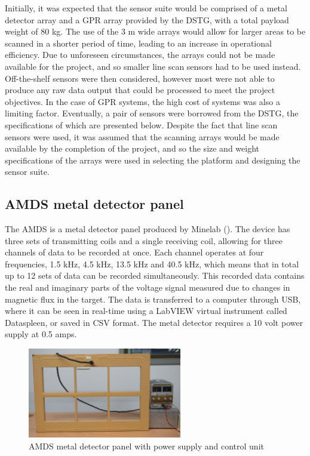 \documentclass[main.tex]{subfiles}
\begin{document}
Initially, it was expected that the sensor suite would be comprised of a metal detector array and a GPR array provided by the DSTG, with a total payload weight of 80 kg. The use of the 3 m wide arrays would allow for larger areas to be scanned in a shorter period of time, leading to an increase in operational efficiency. Due to unforeseen circumstances, the arrays could not be made available for the project, and so smaller line scan sensors had to be used instead. Off-the-shelf sensors were then considered, however most were not able to produce any raw data output that could be processed to meet the project objectives. In the case of GPR systems, the high cost of systems was also a limiting factor. Eventually, a pair of sensors were borrowed from the DSTG, the specifications of which are presented below. Despite the fact that line scan sensors were used, it was assumed that the scanning arrays would be made available by the completion of the project, and so the size and weight specifications of the arrays were used in selecting the platform and designing the sensor suite. 

\subsection{AMDS metal detector panel}
The AMDS is a metal detector panel produced by Minelab (). The device has three sets of transmitting coils and a single receiving coil, allowing for three channels of data to be recorded at once. Each channel operates at four frequencies, 1.5 kHz, 4.5 kHz, 13.5 kHz and 40.5 kHz, which means that in total up to 12 sets of data can be recorded simultaneously. This recorded data contains the real and imaginary parts of the voltage signal measured due to changes in magnetic flux in the target. The data is transferred to a computer through USB, where it can be seen in real-time using a LabVIEW virtual instrument called Dataspleen, or saved in CSV format. The metal detector requires a 10 volt power supply at 0.5 amps.  

\begin{figure}[ht]
\includegraphics[width=0.6\textwidth]{3-ConceptDesign/AMDS.JPG}
\centering
\caption{AMDS metal detector panel with power supply and control unit} 
\end{figure}
\end{document}
